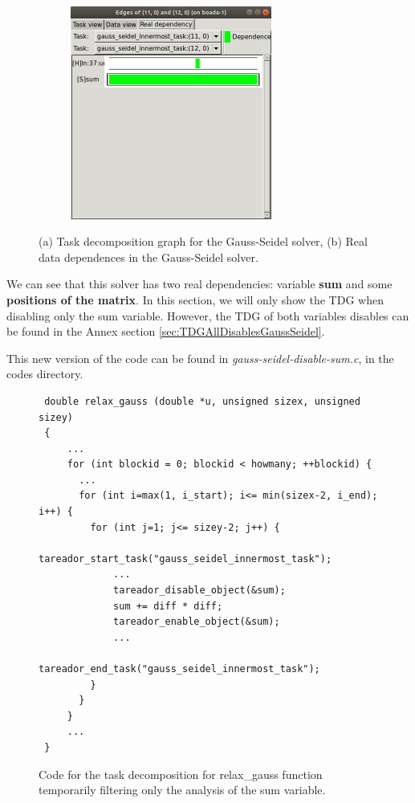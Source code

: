 \documentclass[12pt, a4paper]{article}
\begin{document}
\begin{figure}[H]
\begin{subfigure}{0.45\textwidth}
\caption{\label{fig:TDGGaussSeidel}}
\end{subfigure}
\begin{subfigure}{0.45\textwidth}
\centering
\includegraphics[scale=0.55,height=7cm]{./images/dependence-gauss-seidel}
\caption{\label{fig:RealDependencyGaussSeidel}}
\end{subfigure}
\caption{(a) Task decomposition graph for the Gauss-Seidel solver, (b) Real data dependences in the Gauss-Seidel solver.}
\end{figure}

We can see that this solver has two real dependencies: variable \textbf{sum} and some \textbf{positions of the matrix}. In this section, we will only show the TDG when disabling only the sum variable. However, the TDG of both variables disables can be found in the Annex section \ref{sec:TDGAllDisablesGaussSeidel}.

This new version of the code can be found in \textit{gauss-seidel-disable-sum.c}, in the codes directory.

\begin{figure}[H]
\begin{lstlisting}
 double relax_gauss (double *u, unsigned sizex, unsigned sizey)
 {
     ...
     for (int blockid = 0; blockid < howmany; ++blockid) {
       ...
       for (int i=max(1, i_start); i<= min(sizex-2, i_end); i++) {
         for (int j=1; j<= sizey-2; j++) {
			 tareador_start_task("gauss_seidel_innermost_task");
			 ...
			 tareador_disable_object(&sum);
			 sum += diff * diff; 
			 tareador_enable_object(&sum);
			 ...
			 tareador_end_task("gauss_seidel_innermost_task");
         }
       }
     }
     ...
 }
\end{lstlisting}
\label{code:tareador-relax-jacobi-disable-sum}
\caption{Code for the task decomposition for relax\_gauss function temporarily filtering only the analysis of the sum variable.}
\end{figure}
\end{document}

